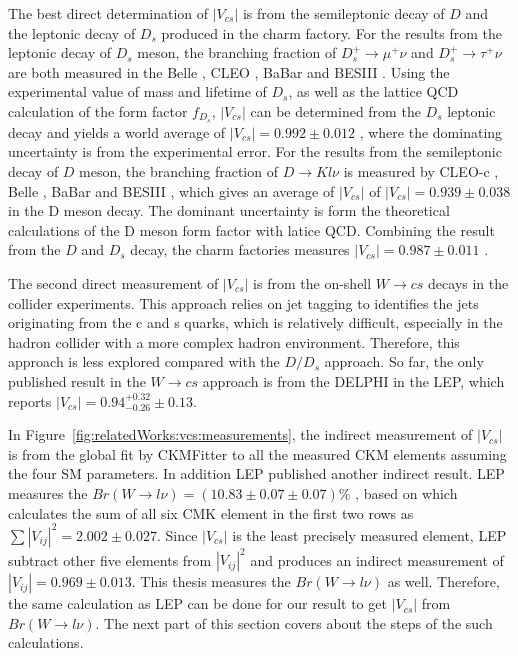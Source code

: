 The best direct determination of $|V_{cs}|$ is from the semileptonic decay of $D$ and the leptonic decay of $D_s$ produced in the charm factory. For the results from the leptonic decay of $D_s$ meson, the branching fraction of $D_s^+ \to \mu^+ \nu$ and $D_s^+ \to \tau^+ \nu$ are both measured in the Belle \cite{Zupanc:2013byn}, CLEO \cite{Alexander:2009ux,Onyisi:2009th,Naik:2009tk}, BaBar \cite{delAmoSanchez:2010jg} and BESIII \cite{Ablikim:2016duz, Ablikim:2018jun}. Using the experimental value of mass and lifetime of $D_s$, as well as the lattice QCD calculation of the form factor $f_{D_s}$, $|V_{cs}|$ can be determined from the $D_s$ leptonic decay and yields a world average of $|V_{cs}|=0.992\pm 0.012$ \cite{Amhis:2019ckw}, where the dominating uncertainty is from the experimental error. For the results from the semileptonic decay of $D$ meson, the branching fraction of $D\to K l\nu$ is measured by CLEO-c \cite{Besson:2009uv}, Belle \cite{Widhalm:2006wz}, BaBar \cite{Aubert:2007wg} and BESIII \cite{Ablikim:2015ixa, Ablikim:2018evp}, which gives an average of $|V_{cs}|$ of $|V_{cs}|=0.939\pm 0.038$ \cite{Amhis:2019ckw} in the D meson decay. The dominant uncertainty is form the theoretical calculations of the D meson form factor with latice QCD. Combining the result from the $D$ and $D_s$ decay, the charm factories measures $|V_{cs}|=0.987\pm 0.011$ \cite{Amhis:2019ckw}.

The second direct measurement of $|V_{cs}|$ is from the on-shell $W\to c s$ decays in the collider experiments. This approach relies on jet tagging to identifies the jets originating from the c and s quarks, which is relatively difficult, especially in the hadron collider with a more complex hadron environment. Therefore, this approach is less explored compared with the $D/D_s$ approach. So far, the only published result in the $W\to c s$  approach is from the DELPHI in the LEP, which reports $|V_{cs}|=0.94 ^{+0.32}_{-0.26}\pm 0.13$. \cite{Abreu:1998ap}

In Figure~\ref{fig:relatedWorks:vcs:measurements}, the indirect measurement of $|V_{cs}|$ is from the global fit by CKMFitter to all the measured CKM elements assuming the four SM parameters. In addition LEP published another indirect result. LEP measures the $Br(W\to l \nu) = (10.83 \pm 0.07 \pm 0.07) \%$ \cite{Schael:2013ita}, based on which calculates the sum of all six CMK element in the first two rows as $\sum |V_{ij}|^2 = 2.002 \pm 0.027$. Since $|V_{cs}|$ is the least precisely measured element, LEP subtract other five elements from $|V_{ij}|^2 $ and produces an indirect measurement of $|V_{ij}|=0.969\pm 0.013$. This thesis measures the $Br(W\to l \nu) $ as well. Therefore, the same calculation as LEP can be done for our result to get $|V_{cs}|$ from $Br(W\to l \nu)$. The next part of this section covers about the steps of the such calculations.


